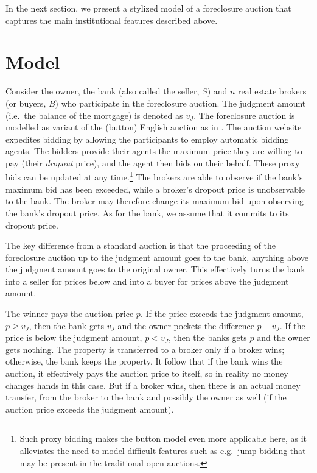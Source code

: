 \documentclass[11pt,twopage]{article}
\begin{document}
In the next section, we present a stylized model of a foreclosure auction that captures the main institutional features described above.


\section{Model}

Consider the owner, the bank (also called the seller, $S$) and $n$ real estate brokers
(or buyers, $B$) who participate in the foreclosure auction. The
judgment amount (i.e.\ the balance of the mortgage) is
denoted as $v_J$. The foreclosure auction is modelled as variant of the (button) English auction as in \cite{milgrom1982theory}. The auction website expedites bidding by allowing the participants to employ automatic bidding agents. The bidders provide their agents the maximum price they are willing to pay (their \emph{dropout} price), and the agent then bids on their behalf. These proxy bids can be updated at any time.\footnote{Such proxy bidding makes the button model even more applicable here, as it alleviates the need to model difficult features such as e.g.\ jump bidding that may be present in the traditional open auctions.} The brokers are able to observe if the bank's maximum bid has been exceeded, while a broker's dropout price is unobservable to the bank. The broker may therefore change its maximum bid upon observing the bank's dropout price. As for the bank, we assume that it commits to its dropout price.

The key difference from a standard auction is that the proceeding of the foreclosure auction up to the judgment amount goes to the bank, anything above the judgment amount goes to the original owner. This effectively turns the bank into a seller for prices below and into a buyer for prices above the judgment amount. 

The winner pays the auction price $p$.  If the price
exceeds the judgment amount, $p\geq v_J$, then the bank gets $v_J$ and
the owner pockets the difference $p - v_J$. If the price is below the
judgment amount, $p<v_J$, then the banks gets $p$ and the owner gets
nothing. The property is transferred to a broker only if a
broker wins; otherwise, the bank keeps the property. It follow that
if the bank wins the auction, it effectively pays the auction price to
itself, so in reality no money changes hands in this case. But if a
broker wins, then there is an actual money transfer, from the broker
to the bank and possibly the owner as well (if the auction price
exceeds the judgment amount).
\end{document}
